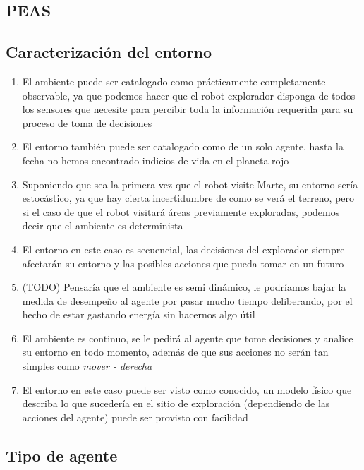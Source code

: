 \documentclass{article}
\begin{document}
        \subsection{PEAS}

        \subsection{Caracterización del entorno}
            \begin{enumerate}
                \item El ambiente puede ser catalogado como prácticamente completamente observable, ya que podemos hacer que el robot explorador disponga de todos los sensores que necesite para percibir toda la información requerida para su proceso de toma de decisiones
                \item El entorno también puede ser catalogado como de un solo agente, hasta la fecha no hemos encontrado indicios de vida en el planeta rojo
                \item Suponiendo que sea la primera vez que el robot visite Marte, su entorno sería estocástico, ya que hay cierta incertidumbre de como se verá el terreno, pero si el caso de que el robot visitará áreas previamente exploradas, podemos decir que el ambiente es determinista
                \item El entorno en este caso es secuencial, las decisiones del explorador siempre afectarán su entorno y las posibles acciones que pueda tomar en un futuro
                \item (TODO) Pensaría que el ambiente es semi dinámico, le podríamos bajar la medida de desempeño al agente por pasar mucho tiempo deliberando, por el hecho de estar gastando energía sin hacernos algo útil
                \item El ambiente es continuo, se le pedirá al agente que tome decisiones y analice su entorno en todo momento, además de que sus acciones no serán tan simples como \emph{mover - derecha}
                \item El entorno en este caso puede ser visto como conocido, un modelo físico que describa lo que sucedería en el sitio de exploración (dependiendo de las acciones del agente) puede ser provisto con facilidad
            \end{enumerate}

        \subsection{Tipo de agente}
\end{document}
